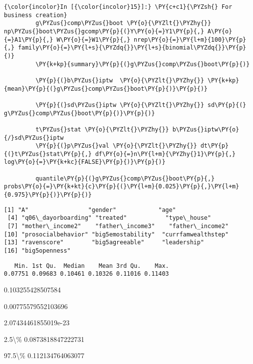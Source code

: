    \begin{Verbatim}[commandchars=\\\{\}]
{\color{incolor}In [{\color{incolor}15}]:} \PY{c+c1}{\PYZsh{} For business creation}
         g\PYZus{}comp\PYZus{}boot \PY{o}{\PYZlt{}\PYZhy{}} np\PYZus{}boot\PYZus{}gcomp\PY{p}{(}Y\PY{o}{=}Y1\PY{p}{,} A\PY{o}{=}A1\PY{p}{,} W\PY{o}{=}W1\PY{p}{,} nrep\PY{o}{=}\PY{l+m}{100}\PY{p}{,} family\PY{o}{=}\PY{l+s}{\PYZdq{}}\PY{l+s}{binomial\PYZdq{}}\PY{p}{)}
         \PY{k+kp}{summary}\PY{p}{(}g\PYZus{}comp\PYZus{}boot\PY{p}{)}
         
         \PY{p}{(}b\PYZus{}iptw  \PY{o}{\PYZlt{}\PYZhy{}} \PY{k+kp}{mean}\PY{p}{(}g\PYZus{}comp\PYZus{}boot\PY{p}{)}\PY{p}{)}
         
         \PY{p}{(}sd\PYZus{}iptw \PY{o}{\PYZlt{}\PYZhy{}} sd\PY{p}{(}  g\PYZus{}comp\PYZus{}boot\PY{p}{)}\PY{p}{)}
         
         t\PYZus{}stat \PY{o}{\PYZlt{}\PYZhy{}} b\PYZus{}iptw\PY{o}{/}sd\PYZus{}iptw
         \PY{p}{(}p\PYZus{}val \PY{o}{\PYZlt{}\PYZhy{}} dt\PY{p}{(}t\PYZus{}stat\PY{p}{,} df\PY{o}{=}n\PY{l+m}{\PYZhy{}1}\PY{p}{,} log\PY{o}{=}\PY{k+kc}{FALSE}\PY{p}{)}\PY{p}{)}
         
         quantile\PY{p}{(}g\PYZus{}comp\PYZus{}boot\PY{p}{,} probs\PY{o}{=}\PY{k+kt}{c}\PY{p}{(}\PY{l+m}{0.025}\PY{p}{,}\PY{l+m}{0.975}\PY{p}{)}\PY{p}{)}
\end{Verbatim}


    \begin{Verbatim}[commandchars=\\\{\}]
 [1] "A"                 "gender"            "age"              
 [4] "q06\_dayorboarding" "treated"           "type\_house"       
 [7] "mother\_income2"    "father\_income3"    "father\_income2"   
[10] "prosocialbehavior" "big5emostability"  "currfamwealthstep"
[13] "ravenscore"        "big5agreeable"     "leadership"       
[16] "big5openness"     

    \end{Verbatim}

    
    \begin{verbatim}
   Min. 1st Qu.  Median    Mean 3rd Qu.    Max. 
0.07751 0.09683 0.10461 0.10326 0.11016 0.11403 
    \end{verbatim}

    
    0.103255428507584

    
    0.00775579552103696

    
    2.07434461855019e-23

    
    \begin{description*}
\item[2.5\textbackslash{}\%] 0.0873818847222731
\item[97.5\textbackslash{}\%] 0.112134764063077
\end{description*}


